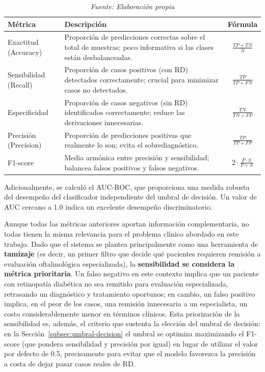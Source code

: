 \begin{table}[H]
\centering
\renewcommand{\arraystretch}{1.8}
\small
\caption{Métricas de evaluación utilizadas}
\label{tab:metricas-evaluacion}
\begin{tabularx}{\textwidth}{@{}l X c@{}}
\hline
\textbf{Métrica} & \textbf{Descripción} & \textbf{Fórmula} \\ \hline
Exactitud (Accuracy) & Proporción de predicciones correctas sobre el total de
muestras; poco informativa si las clases están desbalanceadas. &
$\frac{TP + TN}{N}$ \\
Sensibilidad (Recall) & Proporción de casos positivos (con RD) detectados
correctamente; crucial para minimizar casos no detectados. &
$\frac{TP}{TP + FN}$ \\
Especificidad & Proporción de casos negativos (sin RD) identificados correctamente;
reduce las derivaciones innecesarias. &
$\frac{TN}{TN + FP}$ \\
Precisión (Precision) & Proporción de predicciones positivas que realmente lo son;
evita el sobrediagnóstico. &
$\frac{TP}{TP + FP}$ \\
F1-score & Media armónica entre precisión y sensibilidad; balancea falsos positivos
y falsos negativos. &
$2 \cdot \frac{P \cdot S}{P + S}$ \\ \hline
\end{tabularx}
\caption*{\textit{Fuente: Elaboración propia}}
\end{table}

Adicionalmente, se calculó el AUC-ROC, que proporciona una
medida robusta del desempeño del clasificador independiente del umbral de decisión. Un
valor de AUC cercano a 1.0 indica un excelente desempeño discriminatorio.

Aunque todas las métricas anteriores aportan información complementaria, no todas tienen
la misma relevancia para el problema clínico abordado en este trabajo. Dado que el
sistema se plantea principalmente como una herramienta de \textbf{tamizaje} (es decir,
un primer filtro que decide qué pacientes requieren remisión a evaluación oftalmológica
especializada), la \textbf{sensibilidad se considera la métrica prioritaria}. Un falso
negativo en este contexto implica que un paciente con retinopatía diabética no sea
remitido para evaluación especializada, retrasando un diagnóstico y tratamiento
oportunos; en cambio, un falso positivo implica, en el peor de los casos, una remisión
innecesaria a un especialista, un costo considerablemente menor en términos clínicos.
Esta priorización de la sensibilidad es, además, el criterio que sustenta la elección del
umbral de decisión: en la Sección~\ref{subsec:umbral-decision} el umbral se optimiza
maximizando el F1-score (que pondera sensibilidad y precisión por igual) en lugar de
utilizar el valor por defecto de 0.5, precisamente para evitar que el modelo favorezca la
precisión a costa de dejar pasar casos reales de RD.

